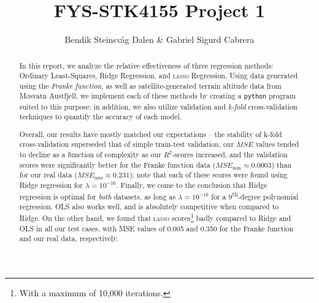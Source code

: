 \documentclass[a4paper,10pt,english]{article}
\begin{document}
\title{FYS-STK4155 Project 1}
\author{Bendik Steinsvåg Dalen \& Gabriel Sigurd Cabrera}

\maketitle
\begin{abstract}
	In this report, we analyze the relative effectiveness of three regression methods: Ordinary Least-Squares, Ridge Regression, and \textsc{lasso} Regression.  Using data generated using the \textit{Franke function}, as well as satellite-generated terrain altitude data from Møsvatn Austfjell, we implement each of these methods by creating a \texttt{python} program suited to this purpose; in addition, we also utilize validation and \textit{k-fold} cross-validation techniques to quantify the accuracy of each model.
	
	Overall, our results have mostly matched our expectations – the stability of k-fold cross-validation superseded that of simple train-test validation, our $MSE$ values tended to decline as a function of complexity as our $R^2$-scores increased, and the validation scores were significantly better for the Franke function data ($MSE_\text{min} \approx 0.0003$) than for our real data ($MSE_\text{min} \approx 0.231$); note that each of these scores were found using Ridge regression for $\lambda = 10^{-16}$.  Finally, we come to the conclusion that Ridge regression is optimal for \textit{both} datasets, as long as $\lambda = 10^{-16}$ for a 9\textsuperscript{th}-degree polynomial regression.  OLS also works well, and is absolutely competitive when compared to Ridge.  On the other hand, we found that \textsc{lasso} scores\footnote{With a maximum of 10,000 iterations.} badly compared to Ridge and OLS in all our test cases, with MSE values of 0.005 and 0.350 for the Franke function and our real data, respectively.
\end{abstract}
\end{document}
